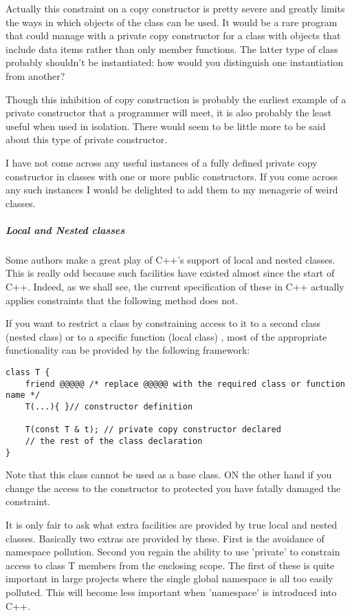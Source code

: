 \documentclass{book}
\begin{document}
Actually this constraint on a copy constructor is pretty severe and greatly limits the ways in which objects of the class can be used.
It would be a rare program that could manage with a private copy constructor for a class with objects that include data items rather than only member functions.
The latter type of class probably shouldn't be instantiated: how would you distinguish one instantiation from another?

Though this inhibition of copy construction is probably the earliest example of a private constructor that a programmer will meet, it is also probably the least useful when used in isolation.
There would seem to be little more to be said about this type of private constructor.

I have not come across any useful instances of a fully defined private copy constructor in classes with one or more public constructors.
If you come across any such instances I would be delighted to add them to my menagerie of weird classes.

\subparagraph{Local and Nested classes}

Some authors make a great play of C++'s support of local and nested classes. This is really odd because such facilities have existed almost since the start of C++.
Indeed, as we shall see, the current specification of these in C++ actually applies constraints that the following method does not.

If you want to restrict a class by constraining access to it to a second class (nested class) or to a specific function (local class)
, most of the appropriate functionality can be provided by the following framework:

\begin{lstlisting}
class T {
    friend @@@@@ /* replace @@@@@ with the required class or function name */
    T(...){ }// constructor definition
    
    T(const T & t); // private copy constructor declared
    // the rest of the class declaration 
}
\end{lstlisting}

Note that this class cannot be used as a base class. ON the other hand if you change the access to the constructor to protected you have fatally damaged the constraint.

It is only fair to ask what extra facilities are provided by true local and nested classes. Basically two extras are provided by these.
First is the avoidance of namespace pollution.
Second you regain the ability to use 'private' to constrain access to class T members from the enclosing scope.
The first of these is quite important in large projects where the single global namespace is all too easily polluted. This will become less important when 'namespace' is introduced into C++.
\end{document}
